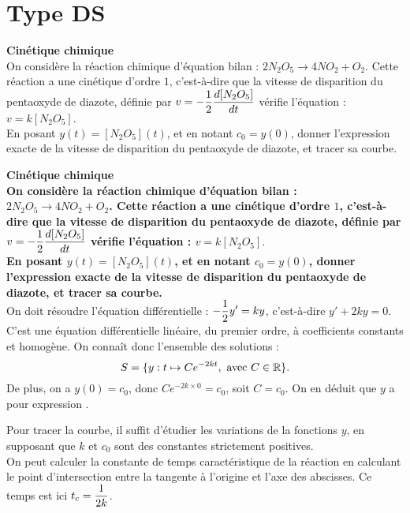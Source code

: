 \documentclass[a4paper, 11pt,reqno]{article}
\begin{document}
\section*{Type DS}

\begin{exercice}  \; \textbf{Cin\'etique chimique}\\
  On consid\`ere la r\'eaction chimique d'\'equation bilan : $2N_2O_5 \rightarrow 4 NO_2 + O_2$. Cette r\'eaction a une cin\'etique d'ordre $1$, c'est-\`a-dire que la vitesse de disparition du pentaoxyde de diazote, d\'efinie par $v = \displaystyle - \frac{1}{2} \frac{d [N_2O_5]}{dt}$ v\'erifie l'\'equation : $v = k [N_2O_5].$\\
  En posant $y(t) = [N_2O_5](t)$, et en notant $c_0=y(0)$, donner l'expression exacte de la vitesse de disparition du pentaoxyde de diazote, et tracer sa courbe. %

\end{exercice}

\begin{correction}  \; \textbf{Cin\'etique chimique}\\
  \textbf{On consid\`ere la r\'eaction chimique d'\'equation bilan : $2N_2O_5 \rightarrow 4 NO_2 + O_2$. Cette r\'eaction a une cin\'etique d'ordre $1$, c'est-\`a-dire que la vitesse de disparition du pentaoxyde de diazote, d\'efinie par $v = \displaystyle - \frac{1}{2} \frac{d [N_2O_5]}{dt}$ v\'erifie l'\'equation : $v = k [N_2O_5].$\\
  En posant $y(t) = [N_2O_5](t)$, et en notant $c_0=y(0)$, donner l'expression exacte de la vitesse de disparition du pentaoxyde de diazote, et tracer sa courbe.}\\ %
  On doit r\'esoudre l'\'equation diff\'erentielle : $-\displaystyle \frac{1}{2} y' =  ky$, c'est-\`a-dire $y'+2 k y = 0$. C'est une \'equation diff\'erentielle lin\'eaire, du premier ordre, \`a coefficients constants et homog\`ene. On conna\^it donc l'ensemble des solutions :
  $$S= \{ y : t \mapsto C e^{-2kt}, \textmd{ avec }C \in \mathbb{R}\}.$$
  De plus, on a $y(0) = c_0$, donc $C e^{-2k\times 0} = c_0$, soit $C=c_0$. On en d\'eduit que $y$ a pour expression .
  \begin{center}

    \hspace*{0.5cm} \begin{minipage}[c]{0.95\linewidth}
      Pour tracer la courbe, il suffit d'\'etudier les variations de la fonctions $y$, en supposant que $k$ et $c_0$ sont des constantes strictement positives.\\
      On peut calculer la constante de temps caract\'eristique de la r\'eaction en calculant le point d'intersection entre la tangente \`a l'origine et l'axe des abscisses. Ce temps est ici $\displaystyle t_c = \frac{1}{2k}$.
    \end{minipage}
  \end{center}

\end{correction}
\end{document}

